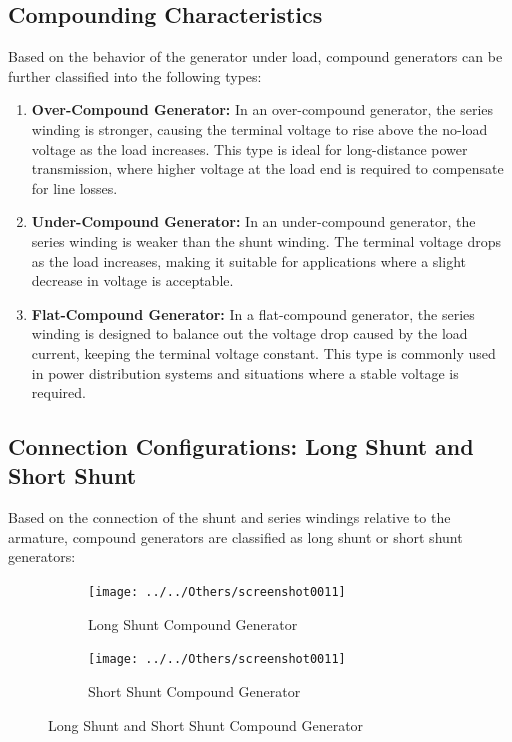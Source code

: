 \documentclass[a4paper,12pt]{article}
\begin{document}
	\subsection{Compounding Characteristics}
	Based on the behavior of the generator under load, compound generators can be further classified into the following types:
	\begin{enumerate}
		\item  \textbf{Over-Compound Generator:}
	In an over-compound generator, the series winding is stronger, causing the terminal voltage to rise above the no-load voltage as the load increases. This type is ideal for long-distance power transmission, where higher voltage at the load end is required to compensate for line losses.
	
	\item \textbf{ Under-Compound Generator:}
	In an under-compound generator, the series winding is weaker than the shunt winding. The terminal voltage drops as the load increases, making it suitable for applications where a slight decrease in voltage is acceptable.
	
\item  \textbf{Flat-Compound Generator:}
	In a flat-compound generator, the series winding is designed to balance out the voltage drop caused by the load current, keeping the terminal voltage constant. This type is commonly used in power distribution systems and situations where a stable voltage is required.
	\end{enumerate}

	
	\subsection{Connection Configurations: Long Shunt and Short Shunt}
	Based on the connection of the shunt and series windings relative to the armature, compound generators are classified as long shunt or short shunt generators:
	\begin{figure}[H]
		\centering
		\begin{subfigure}[t]{0.48\textwidth}
			\centering
				\texttt{[image: ../../Others/screenshot0011]}
			\caption{Long Shunt Compound Generator}
		\end{subfigure}
		\hfill
		\begin{subfigure}[t]{0.48\textwidth}
			\centering
				\texttt{[image: ../../Others/screenshot0011]}
			\caption{Short Shunt Compound Generator}
		\end{subfigure}
		
		\caption{Long Shunt and Short Shunt Compound Generator }
	\end{figure}
\end{document}

